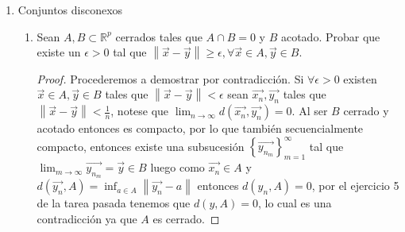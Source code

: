 \documentclass[letterpaper]{article}
\theoremstyle{definition}
\theoremstyle{lemathm}
\theoremstyle{lemathm}
\theoremstyle{lemathm}
\theoremstyle{lemademthm}
\newcommand{\limtoinf}[1]{\lim_{#1\to\infty}}
\newcommand{\pars}[1]{\left( #1 \right) }
\newcommand{\bracs}[1]{\left[ #1 \right] }
\newcommand{\norm}[1]{\left\lVert#1\right\rVert}
\newcommand{\set}[1]{\left \{ #1 \right\} }
\newcommand{\RR}{\mathbb{R}}
\newcommand{\1}{\mathbbm{1}}
\begin{document}
\begin{enumerate}
		el cual se llama cubierta abierta convexa de $A$. Probar que $co(A)$ es compacto en $\RR^p$.

		\begin{proof}
			Sea $\set{z_n}_{n=1}^{\infty}\subset A$. Para todo $z_n$ existen $x_n,y_n \in A, t \in \bracs{0,1}$ tales que 
			
			\[z_n =  t\vec{x_n} + (1-t)\vec{y_n}.\]
			
			Al ser $A$ compacto entonces es secuencialmente compacto, por lo tanto existe
			
			\[\set{x_{n_m}}_{m=1}^{\infty}\xrightarrow{m \to \infty} x \in A\]
			
			y además 
			
			\[\set{y_{n_{m_l}}}\xrightarrow{l \to \infty} y \in A \text{(también $x_{n_{m_{l}}} \xrightarrow{m \to \infty} x$)},\]
			
			por lo que 
			
			\[z_{n_{m_l}} = t\vec{x_{n_{m_l}}} + (1-t)\vec{y_{n_{m_l}}} \xrightarrow{m \to \infty} t\vec{x} + (1-t)\vec{y}\in co(A)\]
			
			por definición de $co(A)$. Por lo que $co(A)$ es secuencialmente compacto y por lo tanto concluimos que $co(A)$ es compacto.
		\end{proof}

		\item Conjuntos disconexos
		
		\begin{enumerate}
			\item Sean $A,B \subset \RR^p$ cerrados tales que $A\cap B = 0$ y $B$ acotado. Probar que existe un $\epsilon > 0$ tal que $\norm{\vec{x}-\vec{y}} \geq \epsilon, \forall \vec{x}\in A, \vec{y}\in B$.
			
			\begin{proof}
				Procederemos a demostrar por contradicción. Si $\forall \epsilon > 0$ existen $\vec{x}\in A, \vec{y} \in B$ tales que $\norm{\vec{x}-\vec{y}} < \epsilon$ sean $\vec{x_n},\vec{y_n}$ tales que $\norm{\vec{x}-\vec{y}} < \frac{1}{n}$, notese que $\limtoinf{n}d\pars{\vec{x_n},\vec{y_n}} = 0$. Al ser $B$ cerrado y acotado entonces es compacto, por lo que también secuencialmente compacto, entonces existe una subsucesión $\set{\vec{y_{n_m}}}_{m=1}^{\infty}$ tal que $\limtoinf{m} \vec{y_{n_m}} = \vec{y} \in B$ luego como $\vec{x_n} \in A$ y $d(\vec{y_n},A) = \inf_{a\in A} \norm{\vec{y_n}-a}$ entonces $d(y_n,A) = 0$, por el ejercicio 5 de la tarea pasada tenemos que $d(y, A) = 0$, lo cual es una contradicción ya que $A$ es cerrado.
			\end{proof}


\end{enumerate}
\end{enumerate}
\end{document}
